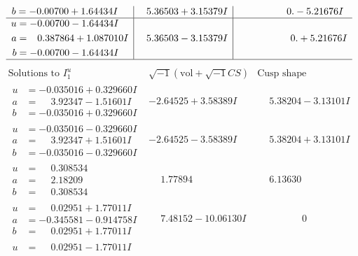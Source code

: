 \documentclass[1p]{elsarticle_modified}
\theoremstyle{definition}
\newcommand{\I}{\sqrt{-1}}
\begin{document}
$$\begin{array}{c|c|c}
\begin{aligned}
b &= -0.00700 + 1.64434 I\end{aligned}
 & \phantom{-}5.36503 + 3.15379 I & \phantom{-0.000000 } 0. - 5.21676 I \\ \hline\begin{aligned}
u &= -0.00700 - 1.64434 I \\
a &= \phantom{-}0.387864 + 1.087010 I \\
b &= -0.00700 - 1.64434 I\end{aligned}
 & \phantom{-}5.36503 - 3.15379 I & \phantom{-0.000000 -}0. + 5.21676 I\\
 \hline 
 \end{array}$$\newpage$$\begin{array}{c|c|c}  
\text{Solutions to }I^u_{1}& \I (\text{vol} + \sqrt{-1}CS) & \text{Cusp shape}\\
 \hline 
\begin{aligned}
u &= -0.035016 + 0.329660 I \\
a &= \phantom{-}3.92347 - 1.51601 I \\
b &= -0.035016 + 0.329660 I\end{aligned}
 & -2.64525 + 3.58389 I & \phantom{-}5.38204 - 3.13101 I \\ \hline\begin{aligned}
u &= -0.035016 - 0.329660 I \\
a &= \phantom{-}3.92347 + 1.51601 I \\
b &= -0.035016 - 0.329660 I\end{aligned}
 & -2.64525 - 3.58389 I & \phantom{-}5.38204 + 3.13101 I \\ \hline\begin{aligned}
u &= \phantom{-}0.308534\phantom{ +0.000000I} \\
a &= \phantom{-}2.18209\phantom{ +0.000000I} \\
b &= \phantom{-}0.308534\phantom{ +0.000000I}\end{aligned}
 & \phantom{-}1.77894\phantom{ +0.000000I} & \phantom{-}6.13630\phantom{ +0.000000I} \\ \hline\begin{aligned}
u &= \phantom{-}0.02951 + 1.77011 I \\
a &= -0.345581 - 0.914758 I \\
b &= \phantom{-}0.02951 + 1.77011 I\end{aligned}
 & \phantom{-}7.48152 - 10.06130 I & \phantom{-0.000000 } 0 \\ \hline\begin{aligned}
u &= \phantom{-}0.02951 - 1.77011 I \\

\end{aligned}
\end{array}$$
\end{document}
